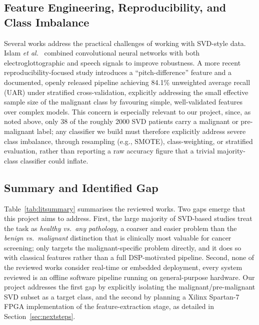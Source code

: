 \documentclass[conference]{IEEEtran}
\begin{document}
\subsection{Feature Engineering, Reproducibility, and Class Imbalance}
Several works address the practical challenges of working with SVD-style data. Islam \emph{et al.}~\cite{islam2022} combined convolutional neural networks with both electroglottographic and speech signals to improve robustness. A more recent reproducibility-focused study introduces a ``pitch-difference'' feature and a documented, openly released pipeline achieving 84.1\% unweighted average recall (UAR) under stratified cross-validation, explicitly addressing the small effective sample size of the malignant class by favouring simple, well-validated features over complex models. This concern is especially relevant to our project, since, as noted above, only 38 of the roughly 2000 SVD patients carry a malignant or pre-malignant label; any classifier we build must therefore explicitly address severe class imbalance, through resampling (e.g., SMOTE), class-weighting, or stratified evaluation, rather than reporting a raw accuracy figure that a trivial majority-class classifier could inflate.

\subsection{Summary and Identified Gap}
Table~\ref{tab:litsummary} summarises the reviewed works. Two gaps emerge that this project aims to address. First, the large majority of SVD-based studies treat the task as \emph{healthy vs.\ any pathology}, a coarser and easier problem than the \emph{benign vs.\ malignant} distinction that is clinically most valuable for cancer screening; only \cite{paterson2024} targets the malignant-specific problem directly, and it does so with classical features rather than a full DSP-motivated pipeline. Second, none of the reviewed works consider real-time or embedded deployment, every system reviewed is an offline software pipeline running on general-purpose hardware. Our project addresses the first gap by explicitly isolating the malignant/pre-malignant SVD subset as a target class, and the second by planning a Xilinx Spartan-7 FPGA implementation of the feature-extraction stage, as detailed in Section~\ref{sec:nextsteps}.
\end{document}

